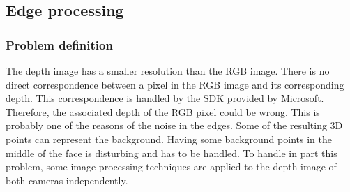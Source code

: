 \subsection{Edge processing}

\subsubsection{Problem definition}

The depth image has a smaller resolution than the RGB image. There is no direct correspondence between a pixel in the RGB image and its corresponding depth. This correspondence is handled by the SDK provided by Microsoft. Therefore, the associated depth of the RGB pixel could be wrong. This is probably one of the reasons of the noise in the edges. Some of the resulting 3D points can represent the background. Having some background points in the middle of the face is disturbing and has to be handled. To handle in part this problem, some image processing techniques are applied to the depth image of both cameras independently.




